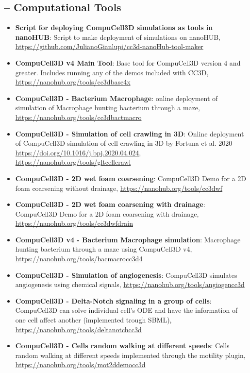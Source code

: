 \subsection*{-- Computational Tools}
\begin{itemize}\setlength\itemsep{-0.9em}
    \item \textbf{Script for deploying CompuCell3D simulations as tools in nanoHUB}: Script to make deployment of \ccds simulations on nanoHUB, \url{https://github.com/JulianoGianlupi/cc3d-nanoHub-tool-maker}
    \item \textbf{CompuCell3D v4 Main Tool}: Base tool for CompuCell3D version 4 and greater. Includes running any of the demos included with CC3D, \url{https://nanohub.org/tools/cc3dbase4x}
    \item \textbf{CompuCell3D - Bacterium Macrophage}: online deployment of \ccds simulation of  Macrophage hunting bacterium through a maze, \url{https://nanohub.org/tools/cc3dbactmacro}
    \item \textbf{CompuCell3D - Simulation of cell crawling in 3D}: Online deployment of CompuCell3D simulation of cell crawling in 3D by Fortuna et al. 2020 \url{https://doi.org/10.1016/j.bpj.2020.04.024}, \url{https://nanohub.org/tools/gltcellcrawl}
    \item \textbf{CompuCell3D - 2D wet foam coarsening}: CompuCell3D Demo for a 2D foam coarsening without drainage, \url{https://nanohub.org/tools/cc3dwf}
    \item \textbf{CompuCell3D - 2D wet foam coarsening with drainage}: CompuCell3D Demo for a 2D foam coarsening with drainage, \url{https://nanohub.org/tools/cc3dwfdrain}
    \item \textbf{CompuCell3D v4 - Bacterium Macrophage simulation}: Macrophage hunting bacterium through a maze using CompuCell3D v4, \url{https://nanohub.org/tools/bacmacrocc3d4}
    \item \textbf{CompuCell3D - Simulation of angiogenesis}: CompuCell3D simulates angiogenesis using chemical signals, \url{https://nanohub.org/tools/angiogencc3d}
    \item \textbf{CompuCell3D - Delta-Notch signaling in a group of cells}: CompuCell3D can solve individual cell's ODE and have the information of one cell affect another (implemented trough SBML), \url{https://nanohub.org/tools/deltanotchcc3d}
    \item \textbf{CompuCell3D - Cells random walking at different speeds}: Cells random walking at different speeds implemented through the motility plugin, \url{https://nanohub.org/tools/mot2ddemocc3d}

\end{itemize}
